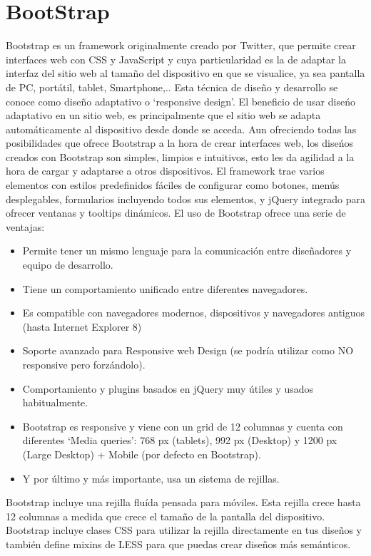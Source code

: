 \documentclass[a4paper, 12pt]{book}
\begin{document}
\section{BootStrap}
\label{sec:bootstrap}
Bootstrap es un framework originalmente creado por Twitter, que permite crear interfaces web con CSS y JavaScript y cuya particularidad es la de adaptar 
la interfaz del sitio web al tama\~no del dispositivo en que se visualice, ya sea pantalla de PC, port\'atil, tablet, Smartphone,.. 
Esta t\'ecnica de dise\~no y desarrollo se conoce como dise\~no adaptativo o `responsive design'.
El beneficio de usar dise\'no adaptativo en un sitio web, es principalmente que el sitio web se adapta autom\'aticamente al dispositivo desde donde 
se acceda. Aun ofreciendo todas las posibilidades que ofrece Bootstrap a la hora de crear interfaces web, los dise\'nos creados con Bootstrap son 
simples, limpios e intuitivos, esto les da agilidad a la hora de cargar y adaptarse a otros dispositivos. El framework trae varios elementos con 
estilos predefinidos f\'aciles de configurar como botones, men\'us desplegables, formularios incluyendo todos sus elementos, y jQuery integrado para 
ofrecer ventanas y tooltips din\'amicos.
El uso de Bootstrap ofrece una serie de ventajas:
\begin{itemize}
  \item Permite tener un mismo lenguaje para la comunicaci\'on entre dise\~nadores y equipo de desarrollo.
  \item Tiene un comportamiento unificado entre diferentes navegadores.
  \item Es compatible con navegadores modernos, dispositivos y navegadores antiguos (hasta Internet Explorer 8)
  \item Soporte avanzado para Responsive web Design (se podr\'ia utilizar como NO responsive pero forz\'andolo).
  \item Comportamiento y plugins basados en jQuery muy \'utiles y usados habitualmente.
  \item Bootstrap es responsive y viene con un grid de 12 columnas y cuenta con diferentes `Media queries': 768 px (tablets), 992 px (Desktop) y 
  1200 px (Large Desktop) + Mobile (por defecto en Bootstrap).
  \item Y por \'ultimo y m\'as importante, usa un sistema de rejillas.
\end{itemize}

Bootstrap incluye una rejilla flu\'ida pensada para m\'oviles. Esta rejilla crece hasta 12 columnas a medida que crece el tama\~no de la pantalla del 
dispositivo. Bootstrap incluye clases CSS para utilizar la rejilla directamente en tus dise\~nos y tambi\'en define mixins de LESS para que puedas 
crear dise\~nos m\'as sem\'anticos.
\end{document}
